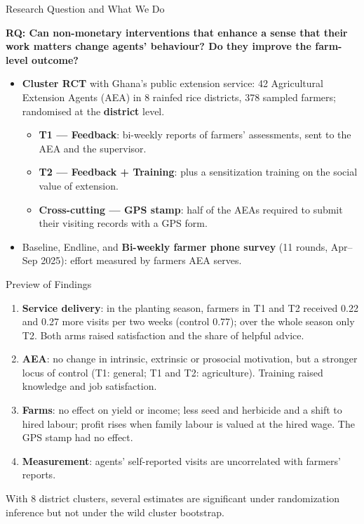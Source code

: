 \documentclass[aspectratio=169]{beamer}
\begin{document}
\begin{frame}{Research Question and What We Do}
	\begin{center}
	\textbf{RQ: Can non-monetary interventions that enhance a sense that their work matters change agents' behaviour? Do they improve the farm-level outcome?}
	\end{center}
	\vspace{0.2cm}
	\begin{itemize}\small
		\item \textbf{Cluster RCT} with Ghana's public extension service: 42 Agricultural Extension Agents (AEA) in 8 rainfed rice districts, 378 sampled farmers; randomised at the \textbf{district} level.
		\begin{itemize}
			\item \textbf{T1 --- Feedback}: bi-weekly reports of farmers' assessments, sent to the AEA and the supervisor.
			\item \textbf{T2 --- Feedback + Training}: plus a sensitization training on the social value of extension.
			\item \textbf{Cross-cutting --- GPS stamp}: half of the AEAs required to submit their visiting records with a GPS form.
		\end{itemize}
	\vspace{0.2cm}
		\item Baseline, Endline, and \textbf{Bi-weekly farmer phone survey} (11 rounds, Apr--Sep 2025): effort measured by farmers AEA serves.
	\end{itemize}
\end{frame}

\begin{frame}{Preview of Findings}
	\begin{enumerate}\small
		\item \textbf{Service delivery}: in the planting season, farmers in T1 and T2 received 0.22 and 0.27 more visits per two weeks (control 0.77); over the whole season only T2. Both arms raised satisfaction and the share of helpful advice.
		\vspace{0.12cm}
		\item \textbf{AEA}: no change in intrinsic, extrinsic or prosocial motivation, but a stronger locus of control (T1: general; T1 and T2: agriculture). Training raised knowledge and job satisfaction.
		\vspace{0.12cm}
		\item \textbf{Farms}: no effect on yield or income; less seed and herbicide and a shift to hired labour; profit rises when family labour is valued at the hired wage. The GPS stamp had no effect.
		\vspace{0.12cm}
		\item \textbf{Measurement}: agents' self-reported visits are uncorrelated with farmers' reports.
	\end{enumerate}
	\vspace{0.1cm}
	{\footnotesize With 8 district clusters, several estimates are significant under randomization inference but not under the wild cluster bootstrap.}
\end{frame}
\end{document}
